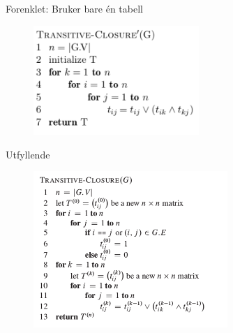 \documentclass[12pt]{report}
\begin{document}
\vspace{\baselineskip}
\begin{multicols}{2}
{\fontsize{13pt}{15.6pt}\selectfont Forenklet: Bruker bare én tabell\par}\par




\begin{figure}[H]
	\begin{Center}
		\includegraphics[width=2.47in,height=1.63in]{./media/image138.png}
	\end{Center}
\end{figure}



\par


\vspace{\baselineskip}

\vspace{\baselineskip}

\vspace{\baselineskip}
{\fontsize{13pt}{15.6pt}\selectfont Utfyllende\par}\par




\begin{figure}[H]
	\begin{Center}
		\includegraphics[width=2.9in,height=2.33in]{./media/image139.png}
	\end{Center}
\end{figure}



\par


\vspace{\baselineskip}

\end{multicols}
\end{document}
